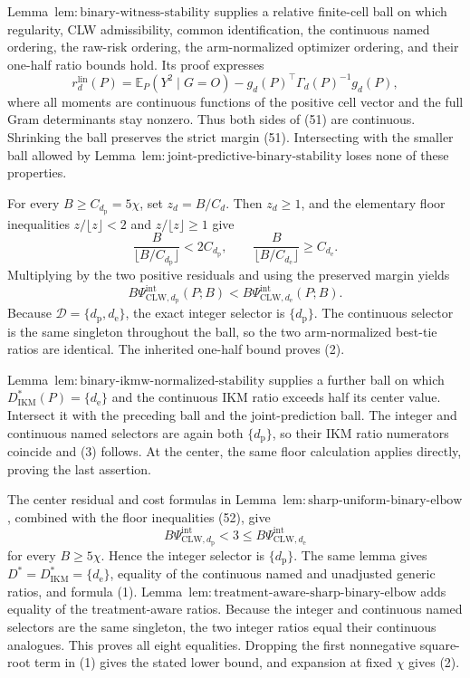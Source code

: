 Lemma~\(\mathrm{lem{:}binary\text{-}witness\text{-}stability}\) supplies a relative finite-cell ball on which regularity, CLW admissibility, common identification, the continuous named ordering, the raw-risk ordering, the arm-normalized optimizer ordering, and their one-half ratio bounds hold.  Its proof expresses
\[
 r_d^{\mathrm{lin}}(P)=
 \mathbb E_P(Y^2\mid G=O)-g_d(P)^\top\Gamma_d(P)^{-1}g_d(P),
\]
where all moments are continuous functions of the positive cell vector and the full Gram determinants stay nonzero.  Thus both sides of (51) are continuous.  Shrinking the ball preserves the strict margin (51).  Intersecting with the smaller ball allowed by Lemma~\(\mathrm{lem{:}joint\text{-}predictive\text{-}binary\text{-}stability}\) loses none of these properties.

For every \(B\ge C_{d_{\mathrm p}}=5\chi\), set \(z_d=B/C_d\).  Then \(z_d\ge1\), and the elementary floor inequalities \(z/\lfloor z\rfloor<2\) and \(z/\lfloor z\rfloor\ge1\) give
\[
 \frac{B}{\lfloor B/C_{d_{\mathrm p}}\rfloor}<2C_{d_{\mathrm p}},
 \qquad
 \frac{B}{\lfloor B/C_{d_{\mathrm e}}\rfloor}\ge C_{d_{\mathrm e}}. \tag{52}
\]
Multiplying by the two positive residuals and using the preserved margin yields
\[
 B\Psi_{\mathrm{CLW},d_{\mathrm p}}^{\mathrm{int}}(P;B)
 <B\Psi_{\mathrm{CLW},d_{\mathrm e}}^{\mathrm{int}}(P;B).
\]
Because \(\mathcal D=\{d_{\mathrm p},d_{\mathrm e}\}\), the exact integer selector is \(\{d_{\mathrm p}\}\).  The continuous selector is the same singleton throughout the ball, so the two arm-normalized best-tie ratios are identical.  The inherited one-half bound proves (2).

Lemma~\(\mathrm{lem{:}binary\text{-}ikmw\text{-}normalized\text{-}stability}\) supplies a further ball on which \(D_{\mathrm{IKM}}^*(P)=\{d_{\mathrm e}\}\) and the continuous IKM ratio exceeds half its center value.  Intersect it with the preceding ball and the joint-prediction ball.  The integer and continuous named selectors are again both \(\{d_{\mathrm p}\}\), so their IKM ratio numerators coincide and (3) follows.  At the center, the same floor calculation applies directly, proving the last assertion.

The center residual and cost formulas in Lemma~\(\mathrm{lem{:}sharp\text{-}uniform\text{-}binary\text{-}elbow}\), combined with the floor inequalities (52), give
\[
 B\Psi_{\mathrm{CLW},d_{\mathrm p}}^{\mathrm{int}}<3
 \le B\Psi_{\mathrm{CLW},d_{\mathrm e}}^{\mathrm{int}}
\]
for every \(B\ge5\chi\).  Hence the integer selector is \(\{d_{\mathrm p}\}\).  The same lemma gives \(D^*=D_{\mathrm{IKM}}^*=\{d_{\mathrm e}\}\), equality of the continuous named and unadjusted generic ratios, and formula (1).  Lemma~\(\mathrm{lem{:}treatment\text{-}aware\text{-}sharp\text{-}binary\text{-}elbow}\) adds equality of the treatment-aware ratios.  Because the integer and continuous named selectors are the same singleton, the two integer ratios equal their continuous analogues.  This proves all eight equalities.  Dropping the first nonnegative square-root term in (1) gives the stated lower bound, and expansion at fixed \(\chi\) gives (2).

